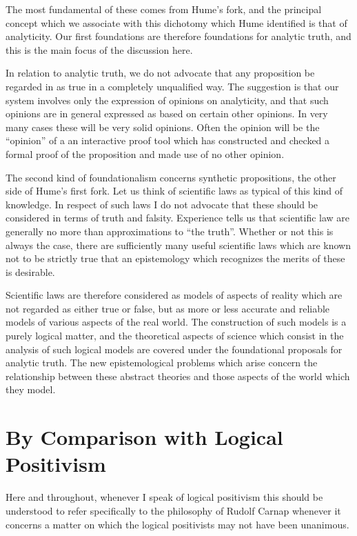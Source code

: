 The most fundamental of these comes from Hume's fork, and the
principal concept which we associate with this dichotomy which Hume
identified is that of analyticity.
Our first foundations are therefore foundations for analytic truth,
and this is the main focus of the discussion here.

In relation to analytic truth, we do not advocate that any proposition
be regarded in as true in a completely unqualified way.
The suggestion is that our system involves only the expression of
opinions on analyticity, and that such opinions are in general
expressed as based on certain other opinions.
In very many cases these will be very solid opinions.
Often the opinion will be the ``opinion'' of a an interactive proof
tool which has constructed and checked a formal proof of the
proposition and made use of no other opinion.

The second kind of foundationalism concerns synthetic propositions,
the other side of Hume's first fork.
Let us think of scientific laws as typical of this kind of knowledge.
In respect of such laws I do not advocate that these should be
considered in terms of truth and falsity.
Experience tells us that scientific law are generally no more than
approximations to ``the truth''.
Whether or not this is always the case, there are sufficiently many
useful scientific laws which are known not to be strictly true that an
epistemology which recognizes the merits of these is desirable.

Scientific laws are therefore considered as models of aspects of
reality which are not regarded as either true or false, but as more or
less accurate and reliable models of various aspects of the real world.
The construction of such models is a purely logical matter, and the
theoretical aspects of science which consist in the analysis of such
logical models are covered under the foundational proposals for
analytic truth.
The new epistemological problems which arise concern the relationship
between these abstract theories and those aspects of the world which
they model.



\section{By Comparison with Logical Positivism}

Here and throughout, whenever I speak of logical positivism this should
be understood to refer specifically to the philosophy of Rudolf Carnap
whenever it concerns a matter on which the logical positivists may not
have been unanimous.

